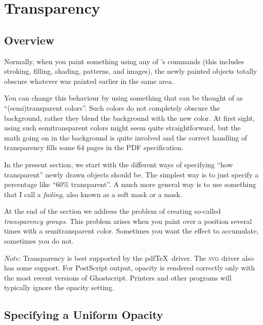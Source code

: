 %
%
%


\section{Transparency}
\label{section-tikz-transparency}

\subsection{Overview}

Normally, when you paint something using any of \tikzname's commands (this
includes stroking, filling, shading, patterns, and images), the newly painted
objects totally obscure whatever was painted earlier in the same area.

You can change this behaviour by using something that can be thought of as
``(semi)transparent colors''. Such colors do not completely obscure the
background, rather they blend the background with the new color. At first
sight, using such semitransparent colors might seem quite straightforward, but
the math going on in the background is quite involved and the correct handling
of transparency fills some 64 pages in the PDF specification.

In the present section, we start with the different ways of specifying ``how
transparent'' newly drawn objects should be. The simplest way is to just
specify a percentage like ``60\% transparent''. A much more general way is to
use something that I call a \emph{fading}, also known as a soft mask or a mask.

At the end of the section we address the problem of creating so-called
\emph{transparency groups}. This problem arises when you paint over a position
several times with a semitransparent color. Sometimes you want the effect to
accumulate, sometimes you do not.

\emph{Note:} Transparency is best supported by the pdf\TeX\ driver. The
\textsc{svg} driver also has some support. For PostScript output, opacity is
rendered correctly only with the most recent versions of Ghostscript. Printers
and other programs will typically ignore the opacity setting.


\subsection{Specifying a Uniform Opacity}

